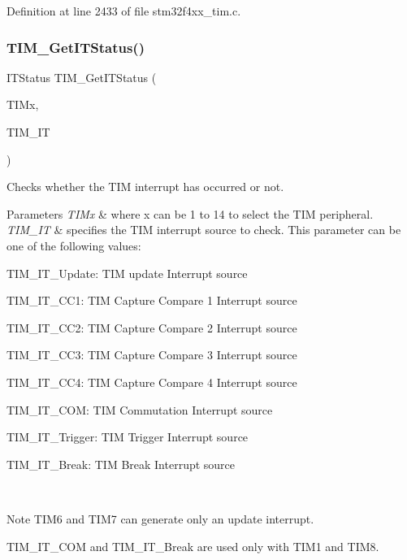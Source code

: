 Definition at line 2433 of file stm32f4xx\+\_\+tim.\+c.

\mbox{\label{group___t_i_m_ga0827a0b411707304f76d33050727c24d}} 
\subsubsection{\texorpdfstring{T\+I\+M\+\_\+\+Get\+I\+T\+Status()}{TIM\_GetITStatus()}}
{\footnotesize\ttfamily I\+T\+Status T\+I\+M\+\_\+\+Get\+I\+T\+Status (\begin{DoxyParamCaption}\item[{\hyperlink{struct_t_i_m___type_def}{T\+I\+M\+\_\+\+Type\+Def} $\ast$}]{T\+I\+Mx,  }\item[{uint16\+\_\+t}]{T\+I\+M\+\_\+\+IT }\end{DoxyParamCaption})}



Checks whether the T\+IM interrupt has occurred or not. 


\begin{DoxyParams}{Parameters}
{\em T\+I\+Mx} & where x can be 1 to 14 to select the T\+IM peripheral. \\
\hline
{\em T\+I\+M\+\_\+\+IT} & specifies the T\+IM interrupt source to check. This parameter can be one of the following values\+: \begin{DoxyItemize}
\item T\+I\+M\+\_\+\+I\+T\+\_\+\+Update\+: T\+IM update Interrupt source \item T\+I\+M\+\_\+\+I\+T\+\_\+\+C\+C1\+: T\+IM Capture Compare 1 Interrupt source \item T\+I\+M\+\_\+\+I\+T\+\_\+\+C\+C2\+: T\+IM Capture Compare 2 Interrupt source \item T\+I\+M\+\_\+\+I\+T\+\_\+\+C\+C3\+: T\+IM Capture Compare 3 Interrupt source \item T\+I\+M\+\_\+\+I\+T\+\_\+\+C\+C4\+: T\+IM Capture Compare 4 Interrupt source \item T\+I\+M\+\_\+\+I\+T\+\_\+\+C\+OM\+: T\+IM Commutation Interrupt source \item T\+I\+M\+\_\+\+I\+T\+\_\+\+Trigger\+: T\+IM Trigger Interrupt source \item T\+I\+M\+\_\+\+I\+T\+\_\+\+Break\+: T\+IM Break Interrupt source\end{DoxyItemize}
\\
\hline
\end{DoxyParams}
\begin{DoxyNote}{Note}
T\+I\+M6 and T\+I\+M7 can generate only an update interrupt. 

T\+I\+M\+\_\+\+I\+T\+\_\+\+C\+OM and T\+I\+M\+\_\+\+I\+T\+\_\+\+Break are used only with T\+I\+M1 and T\+I\+M8.
\end{DoxyNote}

